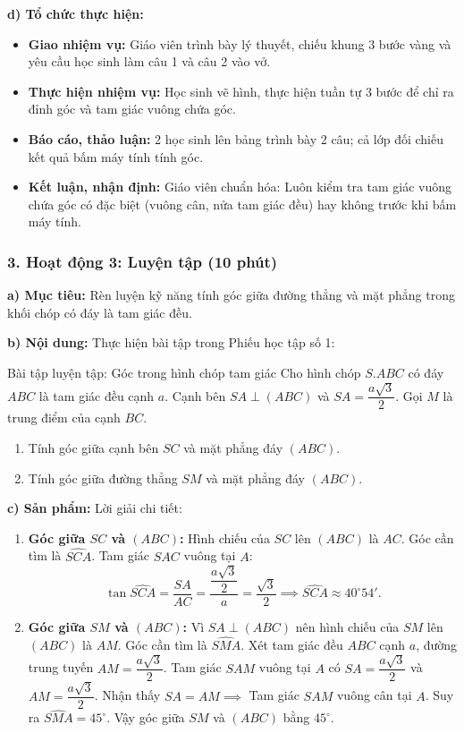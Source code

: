 \documentclass[12pt, a4paper]{article}
\begin{document}
\noindent \textbf{d) Tổ chức thực hiện:}
\begin{itemize}[leftmargin=0.6cm]
    \item \textbf{Giao nhiệm vụ:} Giáo viên trình bày lý thuyết, chiếu khung 3 bước vàng và yêu cầu học sinh làm câu 1 và câu 2 vào vở.
    \item \textbf{Thực hiện nhiệm vụ:} Học sinh vẽ hình, thực hiện tuần tự 3 bước để chỉ ra đỉnh góc và tam giác vuông chứa góc.
    \item \textbf{Báo cáo, thảo luận:} 2 học sinh lên bảng trình bày 2 câu; cả lớp đối chiếu kết quả bấm máy tính tính góc.
    \item \textbf{Kết luận, nhận định:} Giáo viên chuẩn hóa: Luôn kiểm tra tam giác vuông chứa góc có đặc biệt (vuông cân, nửa tam giác đều) hay không trước khi bấm máy tính.
\end{itemize}

\subsubsection*{3. Hoạt động 3: Luyện tập (10 phút)}

\noindent \textbf{a) Mục tiêu:}
Rèn luyện kỹ năng tính góc giữa đường thẳng và mặt phẳng trong khối chóp có đáy là tam giác đều.

\noindent \textbf{b) Nội dung:}
Thực hiện bài tập trong Phiếu học tập số 1:
\begin{pedabox}{Bài tập luyện tập: Góc trong hình chóp tam giác}
Cho hình chóp $S.ABC$ có đáy $ABC$ là tam giác đều cạnh $a$. Cạnh bên $SA \perp (ABC)$ và $SA = \dfrac{a\sqrt{3}}{2}$.
Gọi $M$ là trung điểm của cạnh $BC$.
\begin{enumerate}[leftmargin=0.6cm]
    \item Tính góc giữa cạnh bên $SC$ và mặt phẳng đáy $(ABC)$.
    \item Tính góc giữa đường thẳng $SM$ và mặt phẳng đáy $(ABC)$.
\end{enumerate}
\end{pedabox}

\noindent \textbf{c) Sản phẩm:}
Lời giải chi tiết:
\begin{enumerate}[leftmargin=0.6cm]
    \item \textbf{Góc giữa $SC$ và $(ABC)$:}
    Hình chiếu của $SC$ lên $(ABC)$ là $AC$. Góc cần tìm là $\widehat{SCA}$.
    Tam giác $SAC$ vuông tại $A$:
    $$\tan \widehat{SCA} = \dfrac{SA}{AC} = \dfrac{\dfrac{a\sqrt{3}}{2}}{a} = \dfrac{\sqrt{3}}{2} \implies \widehat{SCA} \approx 40^\circ 54'.$$
    \item \textbf{Góc giữa $SM$ và $(ABC)$:}
    Vì $SA \perp (ABC)$ nên hình chiếu của $SM$ lên $(ABC)$ là $AM$. Góc cần tìm là $\widehat{SMA}$.
    Xét tam giác đều $ABC$ cạnh $a$, đường trung tuyến $AM = \dfrac{a\sqrt{3}}{2}$.
    Tam giác $SAM$ vuông tại $A$ có $SA = \dfrac{a\sqrt{3}}{2}$ và $AM = \dfrac{a\sqrt{3}}{2}$.
    Nhận thấy $SA = AM \implies$ Tam giác $SAM$ vuông cân tại $A$.
    Suy ra $\widehat{SMA} = 45^\circ$.
    Vậy góc giữa $SM$ và $(ABC)$ bằng $45^\circ$.
\end{enumerate}
\end{document}
